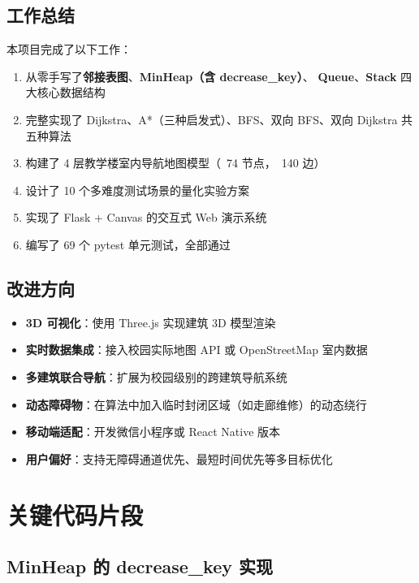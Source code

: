 \documentclass[11pt,a4paper]{ctexart}
\begin{document}
\subsection{工作总结}

本项目完成了以下工作：

\begin{enumerate}
    \item 从零手写了\textbf{邻接表图}、\textbf{MinHeap（含 decrease\_key）}、
          \textbf{Queue}、\textbf{Stack} 四大核心数据结构
    \item 完整实现了 Dijkstra、A*（三种启发式）、BFS、双向 BFS、双向 Dijkstra
          共五种算法
    \item 构建了 4 层教学楼室内导航地图模型（~74 节点，~140 边）
    \item 设计了 10 个多难度测试场景的量化实验方案
    \item 实现了 Flask + Canvas 的交互式 Web 演示系统
    \item 编写了 69 个 pytest 单元测试，全部通过
\end{enumerate}

\subsection{改进方向}

\begin{itemize}
    \item \textbf{3D 可视化}：使用 Three.js 实现建筑 3D 模型渲染
    \item \textbf{实时数据集成}：接入校园实际地图 API 或 OpenStreetMap 室内数据
    \item \textbf{多建筑联合导航}：扩展为校园级别的跨建筑导航系统
    \item \textbf{动态障碍物}：在算法中加入临时封闭区域（如走廊维修）的动态绕行
    \item \textbf{移动端适配}：开发微信小程序或 React Native 版本
    \item \textbf{用户偏好}：支持无障碍通道优先、最短时间优先等多目标优化
\end{itemize}

\appendix

\section{关键代码片段}

\subsection{MinHeap 的 decrease\_key 实现}
\end{document}
